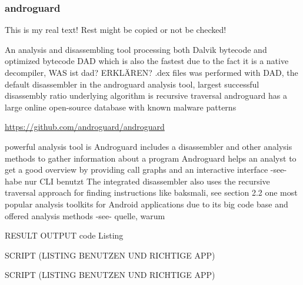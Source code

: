 \subsubsection{androguard} \label{subsubsection:forensics-tools-java-androguard}
This is my real text! Rest might be copied or not be checked!

%
An analysis and disassembling tool processing both Dalvik bytecode and optimized bytecode\newline
DAD which is also the fastest due to the fact it is a native decompiler, WAS ist dad? ERKLÄREN? .dex files was performed with DAD, the default disassembler
in the androguard analysis tool, largest successful disassembly
ratio\newline
underlying algorithm is recursive traversal\newline
androguard has a large online open-source database with known malware patterns\newline
\cite{kovachevaMaster}
%




\url{https://github.com/androguard/androguard}

powerful analysis tool is Androguard\newline
includes a disassembler and other analysis methods to gather information about a program\newline
Androguard helps an analyst to get a good overview by providing call graphs and an interactive interface -see- habe nur CLI benutzt\newline
The integrated disassembler also uses the recursive traversal approach for finding instructions like baksmali, see section 2.2\newline
one most popular analysis toolkits for Android applications due to its big code base and offered analysis methods -see- quelle, warum\newline


RESULT OUTPUT
code Listing

SCRIPT (LISTING BENUTZEN UND RICHTIGE APP)

SCRIPT (LISTING BENUTZEN UND RICHTIGE APP)


